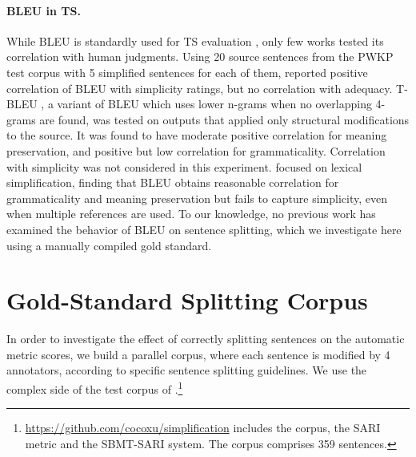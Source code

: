 \documentclass[11pt,a4paper]{article}
\begin{document}
\paragraph{BLEU in TS.}
While BLEU is standardly used for TS evaluation \citep[e.g.,][]{Xu16,Ni17,ZL17,MS17}, only few works tested its correlation with human judgments. Using 20 source sentences from the PWKP test corpus \citep{Z10} with 5 simplified sentences for each of them, \citet{W12} reported positive correlation of BLEU with simplicity ratings, but no correlation with adequacy.
T-BLEU \citep{S14}, a variant of BLEU which uses lower n-grams when no overlapping 4-grams are found,
was tested on outputs that applied only structural modifications to the source.
It was found to have moderate positive correlation for meaning preservation, and positive but low correlation
for grammaticality. Correlation with simplicity was not considered in this experiment.
\citet{Xu16} focused on lexical simplification, finding that BLEU obtains reasonable correlation for grammaticality
and meaning preservation but fails to capture simplicity, even when multiple references are used.
To our knowledge, no previous work has examined the behavior of BLEU on sentence splitting, which we investigate here using a manually compiled gold standard.

\section{Gold-Standard Splitting Corpus} \label{sec:corpus}
In order to investigate the effect of correctly splitting sentences on the automatic metric scores, we build a parallel corpus, 
where each sentence is modified by 4 annotators, according to specific sentence splitting guidelines.
We use the complex side of the test corpus of \citet{Xu16}.\footnote{\url{https://github.com/cocoxu/simplification} includes the corpus, the SARI metric and the SBMT-SARI system. The corpus comprises 359 sentences.} %
\end{document}
